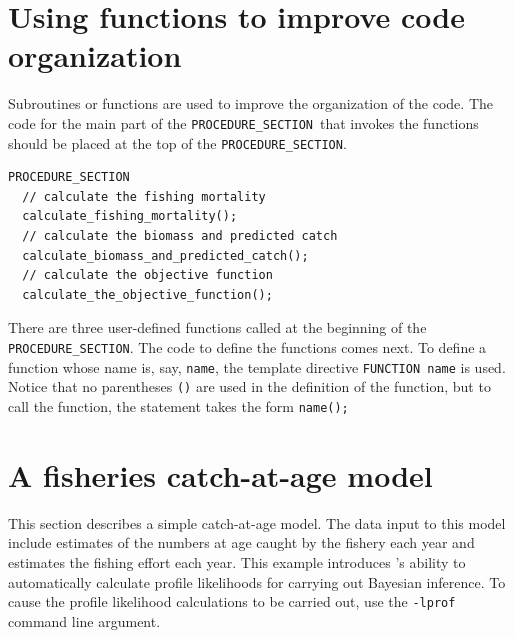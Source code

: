 \documentclass{admbmanual}
\newcommand\PROS{\texttt{PROCEDURE\_SECTION}}
\begin{document}
\section{Using functions to improve code organization}

Subroutines or functions are used to improve the organization of the code. The
code for the main part of the \PROS\ that invokes the functions should be placed
at the top of the \PROS.
\begin{lstlisting}
PROCEDURE_SECTION
  // calculate the fishing mortality
  calculate_fishing_mortality();
  // calculate the biomass and predicted catch
  calculate_biomass_and_predicted_catch();
  // calculate the objective function
  calculate_the_objective_function();
\end{lstlisting}
There are three user-defined functions called at the beginning of the
\texttt{PROCEDURE\_SECTION}. The code to define the functions comes next. To
define a function whose name is, say, \texttt{name}, the template directive
\texttt{FUNCTION name} is used. Notice that no parentheses \texttt{()} are used
in the definition of the function, but to call the function, the statement takes
the form \mbox{\texttt{name();}}

{}

\section{A fisheries catch-at-age model}

This section describes a simple catch-at-age model. The data input to this model
include estimates of the numbers at age caught by the fishery each year and
estimates the fishing effort each year. This example introduces \ADM's ability
to automatically calculate profile likelihoods for carrying out Bayesian
inference. To cause the profile likelihood calculations to be carried out, use
the \texttt{-lprof} command line argument.
\end{document}
